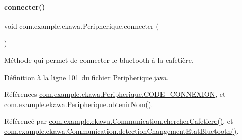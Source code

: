 \paragraph{\texorpdfstring{connecter()}{connecter()}}
{\footnotesize\ttfamily void com.\+example.\+ekawa.\+Peripherique.\+connecter (\begin{DoxyParamCaption}{ }\end{DoxyParamCaption})}



Méthode qui permet de connecter le bluetooth à la cafetière. 



Définition à la ligne \hyperlink{_peripherique_8java_source_l00101}{101} du fichier \hyperlink{_peripherique_8java_source}{Peripherique.\+java}.



Références \hyperlink{_peripherique_8java_source_l00033}{com.\+example.\+ekawa.\+Peripherique.\+C\+O\+D\+E\+\_\+\+C\+O\+N\+N\+E\+X\+I\+ON}, et \hyperlink{_peripherique_8java_source_l00244}{com.\+example.\+ekawa.\+Peripherique.\+obtenir\+Nom()}.



Référencé par \hyperlink{_communication_8java_source_l00276}{com.\+example.\+ekawa.\+Communication.\+chercher\+Cafetiere()}, et \hyperlink{_communication_8java_source_l00078}{com.\+example.\+ekawa.\+Communication.\+detection\+Changement\+Etat\+Bluetooth()}.


